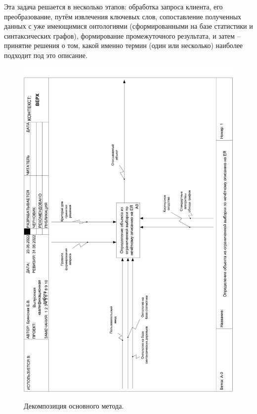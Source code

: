 Эта задача решается в несколько этапов: обработка запроса клиента, его преобразование, путём извлечения ключевых слов, сопоставление полученных данных с уже имеющимися онтологиями (сформированными на базе статистики и синтаксических графов), формирование промежуточного результата, и затем -- принятие решения о том, какой именно термин (один или несколько) наиболее подходит под это описание.
\begin{figure}[h]
	\begin{center}
		{\includegraphics[scale = 0.39, angle=-90, page=2]{img/idef0/pdf/general.pdf}}
		\caption{Декомпозиция основного метода.}
		\label{fig21:image}
	\end{center}
\end{figure}

